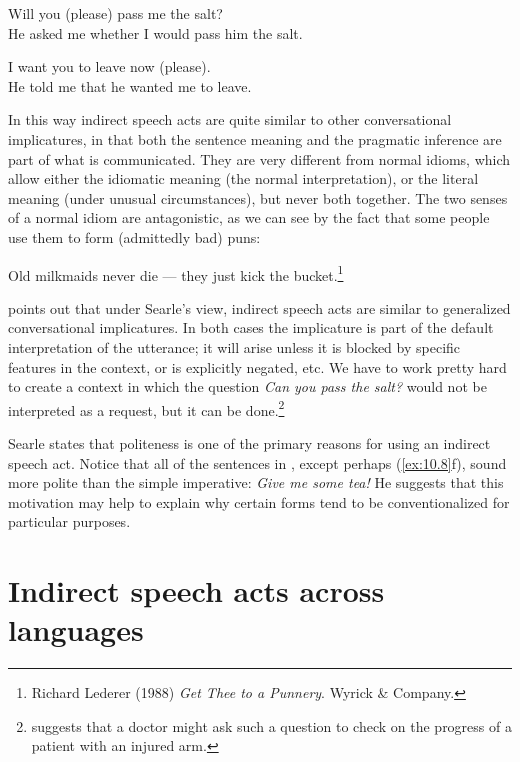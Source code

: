 \ea \label{ex:10.12}
\ea Will you (please) pass me the salt?\\
\ex He asked me whether I would pass him the salt.
                       \z
\z

\ea \label{ex:10.13}
\ea I want you to leave now (please).\\
\ex He told me that he wanted me to leave.
                       \z
\z


In this way indirect speech acts are quite similar to other conversational implicatures, in that both the sentence meaning and the pragmatic inference are part of what is communicated. They are very different from normal idioms, which allow either the idiomatic meaning (the normal interpretation), or the literal meaning (under unusual circumstances), but never both together. The two senses of a normal idiom are antagonistic, as we can see by the fact that some people use them to form (admittedly bad) puns:


\ea \label{ex:10.14}
Old milkmaids never die — they just kick the bucket.\footnote{Richard Lederer (1988) \textit{Get Thee to a Punnery}. Wyrick \& Company.}
\z


\citet[196]{Birner20122013} points out that under Searle’s view, indirect speech acts are similar to generalized conversational implicatures. In both cases the implicature is part of the default interpretation of the utterance; it will arise unless it is blocked by specific features in the context, or is explicitly negated, etc. We have to work pretty hard to create a context in which the question \textit{Can you pass the salt?} would not be interpreted as a request, but it can be done.\footnote{\citet[69]{Searle1975} suggests that a doctor might ask such a question to check on the progress of a patient with an injured arm.}



Searle states that politeness is one of the primary reasons for using an indirect speech act. Notice that all of the sentences in , except perhaps (\ref{ex:10.8}f), sound more polite than the simple imperative: \textit{Give me some tea!} He suggests that this motivation may help to explain why certain forms tend to be conventionalized for particular purposes.



\section{Indirect speech acts across languages}\label{sec:10.4}

